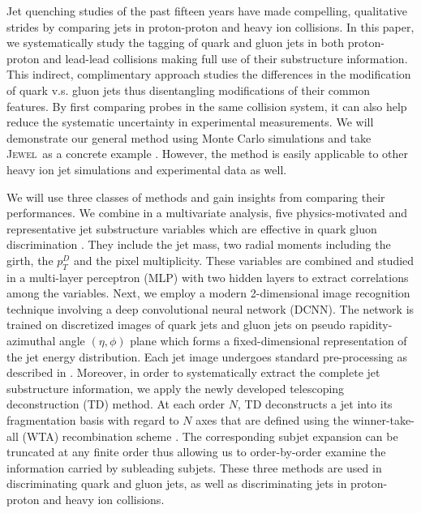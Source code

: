 \documentclass[notoc,preprintnumbers]{JHEP3}
\newcommand{\jw}{\textsc{Jewel}~}
\begin{document}
Jet quenching studies of the past fifteen years have made compelling, qualitative strides by comparing jets in proton-proton and heavy ion collisions. In this paper, we systematically study the tagging of quark and gluon jets in both proton-proton and lead-lead collisions making full use of their substructure information. This indirect, complimentary approach studies the  differences in the modification of quark v.s. gluon jets thus disentangling modifications of their common features. By first comparing probes in the same collision system, it can also help reduce the systematic uncertainty in experimental measurements. We will demonstrate our general method using Monte Carlo simulations and take \jw as a concrete example \cite{Zapp:2013zya,KunnawalkamElayavalli:2016ttl}. However, the method is easily applicable to other heavy ion jet simulations \cite{Armesto:2009fj,Casalderrey-Solana:2016jvj,Cao:2017zih} and experimental data as well.

We will use three classes of methods and gain insights from comparing their performances. We combine in a multivariate analysis, five physics-motivated and representative jet substructure variables which are effective in quark gluon discrimination \cite{Gallicchio:2012ez}. They include the jet mass, two radial moments including the girth, the $p_T^D$ and the pixel multiplicity. These variables are combined and studied in a multi-layer perceptron (MLP) with two hidden layers to extract correlations among the variables. Next, we employ a modern 2-dimensional image recognition technique involving a deep convolutional neural network (DCNN). The network is trained on discretized images of quark jets and gluon jets on pseudo rapidity-azimuthal angle $(\eta,\phi)$ plane which forms a fixed-dimensional representation of the jet energy distribution. Each jet image undergoes standard pre-processing as described in \cite{deOliveira:2015xxd}. Moreover, in order to systematically extract the complete jet substructure information, we apply the newly developed telescoping deconstruction (TD) method. At each order $N$, TD deconstructs a jet into its fragmentation basis with regard to $N$ axes that are defined using the winner-take-all (WTA) recombination scheme \cite{Bertolini:2013iqa}. The corresponding subjet expansion can be truncated at any finite order thus allowing us to order-by-order examine the information carried by subleading subjets. These three methods are used in discriminating quark and gluon jets, as well as discriminating jets in proton-proton and heavy ion collisions.
\end{document}
